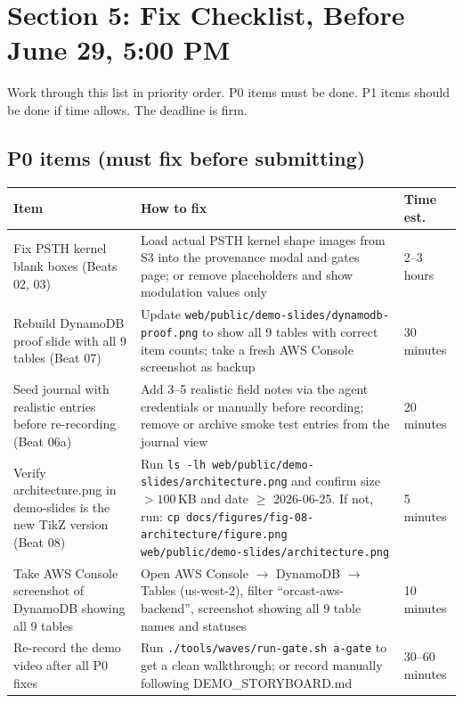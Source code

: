 \section{Section 5: Fix Checklist, Before June 29, 5:00 PM}

Work through this list in priority order. P0 items must be done. P1 items should be done if time allows. The deadline is firm.

\subsection{P0 items (must fix before submitting)}

\begin{center}
\small
\begin{tabular}{p{5.5cm}p{4.5cm}p{2.2cm}}
\toprule
\textbf{Item} & \textbf{How to fix} & \textbf{Time est.} \\
\midrule

Fix PSTH kernel blank boxes (Beats 02, 03) &
Load actual PSTH kernel shape images from S3 into the provenance modal and gates page; or remove placeholders and show modulation values only &
2--3 hours \\

\midrule

Rebuild DynamoDB proof slide with all 9 tables (Beat 07) &
Update \texttt{web/public/demo-slides/dynamodb-proof.png} to show all 9 tables with correct item counts; take a fresh AWS Console screenshot as backup &
30 minutes \\

\midrule

Seed journal with realistic entries before re-recording (Beat 06a) &
Add 3--5 realistic field notes via the agent credentials or manually before recording; remove or archive smoke test entries from the journal view &
20 minutes \\

\midrule

Verify architecture.png in demo-slides is the new TikZ version (Beat 08) &
Run \texttt{ls -lh web/public/demo-slides/architecture.png} and confirm size $>100$\,KB and date $\geq$ 2026-06-25. If not, run: \texttt{cp docs/figures/fig-08-architecture/figure.png web/public/demo-slides/architecture.png} &
5 minutes \\

\midrule

Take AWS Console screenshot of DynamoDB showing all 9 tables &
Open AWS Console $\to$ DynamoDB $\to$ Tables (us-west-2), filter ``orcast-aws-backend'', screenshot showing all 9 table names and statuses &
10 minutes \\

\midrule

Re-record the demo video after all P0 fixes &
Run \texttt{./tools/waves/run-gate.sh a-gate} to get a clean walkthrough; or record manually following DEMO\_STORYBOARD.md &
30--60 minutes \\

\bottomrule
\end{tabular}
\end{center}

